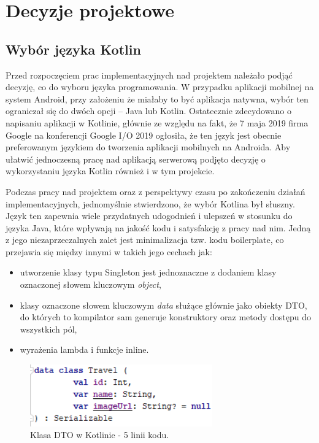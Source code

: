 \documentclass[10pt,twoside,a4paper]{report}
\begin{document}
\chapter{Decyzje projektowe}

\section{Wybór języka Kotlin}
\par Przed rozpoczęciem prac implementacyjnych nad projektem należało podjąć decyzję, co do wyboru języka programowania. W przypadku aplikacji mobilnej na system Android, przy założeniu że miałaby to być aplikacja natywna, wybór ten ograniczał się do dwóch opcji – Java lub Kotlin. Ostatecznie zdecydowano o napisaniu aplikacji w Kotlinie, głównie ze względu na fakt, że 7 maja 2019 firma Google na konferencji Google I/O 2019 ogłosiła, że ten język jest obecnie preferowanym językiem do tworzenia aplikacji mobilnych na Androida\cite{Google I/O 2019}. Aby ułatwić jednoczesną pracę nad aplikacją serwerową podjęto decyzję o wykorzystaniu języka Kotlin również i w tym projekcie.
\par Podczas pracy nad projektem oraz z perspektywy czasu po zakończeniu działań implementacyjnych, jednomyślnie stwierdzono, że wybór Kotlina był słuszny. Język ten zapewnia wiele przydatnych udogodnień i ulepszeń w stosunku do języka Java, które wpływają na jakość kodu i satysfakcję z pracy nad nim. Jedną z jego niezaprzeczalnych zalet jest minimalizacja tzw. kodu boilerplate, co przejawia się między innymi w takich jego cechach jak: 

\begin{itemize}
\item utworzenie klasy typu Singleton jest jednoznaczne z dodaniem klasy oznaczonej słowem kluczowym \textit{object},
\item klasy oznaczone słowem kluczowym \textit{data} służące głównie jako obiekty DTO, do których to kompilator sam generuje konstruktory oraz metody dostępu do wszystkich pól,
\item wyrażenia lambda i funkcje inline.
\end{itemize}

\begin{figure}[h]
\centering
\includegraphics[width=0.7\textwidth]{dtoKotlin}
\caption{Klasa DTO w Kotlinie - 5 linii kodu.}
\label{fig:dtoKotlin}
\end{figure}
\end{document}

